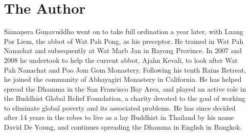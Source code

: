 \vspace*{-0.2\baselineskip}
\dividerRule
\vspace*{-1.5\baselineskip}
\vfill

\section{The Author}

Sāmaṇera Guṇavuddho went on to take full ordination a year
later, with Luang Por Liem, the abbot of Wat Pah Pong, as his preceptor. 
He trained in Wat Pah Nanachat and subsequently at Wat Marb Jan in
Rayong Province. In 2007 and 2008 he undertook to help the current
abbot, Ajahn Kevalī, to look after Wat Pah Nanachat and Poo Jom Gom
Monastery. Following his tenth Rains Retreat, he joined the community of
Abhayagiri Monastery in California. He has helped spread the Dhamma in
the San Francisco Bay Area, and played an active role in the Buddhist
Global Relief Foundation, a charity devoted to the goal of working to
eliminate global poverty and its associated problems. He has since
decided after 14 years in the robes to live as a lay Buddhist in
Thailand by his name David De Young, and continues spreading the Dhamma
in English in Bangkok.

